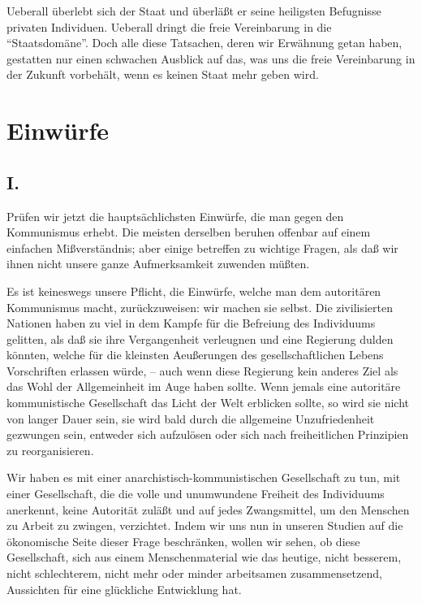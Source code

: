 \documentclass{scrbook}
\begin{document}
Ueberall überlebt sich der Staat und überläßt er seine heiligsten Befugnisse privaten Individuen. Ueberall dringt die freie Vereinbarung in die ``Staatsdomäne''. Doch alle diese Tatsachen, deren wir Erwähnung getan haben, gestatten nur einen schwachen Ausblick auf das, was uns die freie Vereinbarung in der Zukunft vorbehält, wenn es keinen Staat mehr geben wird.

\chapter{Einwürfe}
\section*{I.}

Prüfen wir jetzt die hauptsächlichsten Einwürfe, die man gegen den Kommunismus erhebt. Die meisten derselben beruhen offenbar auf einem einfachen Mißverständnis; aber einige betreffen zu wichtige Fragen, als daß wir ihnen nicht unsere ganze Aufmerksamkeit zuwenden müßten.

Es ist keineswegs unsere Pflicht, die Einwürfe, welche man dem autoritären Kommunismus macht, zurückzuweisen: wir machen sie selbst. Die zivilisierten Nationen haben zu viel in dem Kampfe für die Befreiung des Individuums gelitten, als daß sie ihre Vergangenheit verleugnen und eine Regierung dulden könnten, welche für die kleinsten Aeußerungen des gesellschaftlichen Lebens Vorschriften erlassen würde, – auch wenn diese Regierung kein anderes Ziel als das Wohl der Allgemeinheit im Auge haben sollte. Wenn jemals eine autoritäre kommunistische Gesellschaft das Licht der Welt erblicken sollte, so wird sie nicht von langer Dauer sein, sie wird bald durch die allgemeine Unzufriedenheit gezwungen sein, entweder sich aufzulösen oder sich nach freiheitlichen Prinzipien zu reorganisieren.

Wir haben es mit einer anarchistisch-kommunistischen Gesellschaft zu tun, mit einer Gesellschaft, die die volle und unumwundene Freiheit des Individuums anerkennt, keine Autorität zuläßt und auf jedes Zwangsmittel, um den Menschen zu Arbeit zu zwingen, verzichtet. Indem wir uns nun in unseren Studien auf die ökonomische Seite dieser Frage beschränken, wollen wir sehen, ob diese Gesellschaft, sich aus einem Menschenmaterial wie das heutige, nicht besserem, nicht schlechterem, nicht mehr oder minder arbeitsamen zusammensetzend, Aussichten für eine glückliche Entwicklung hat.
\end{document}
